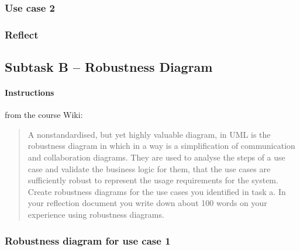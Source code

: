 



\subsubsection{Use case 2}\label{task-1a-usecase2}
%



\subsubsection{Reflect}\label{task-1a-reflect}
%



\subsection{Subtask B -- Robustness Diagram}\label{task-1b}
\paragraph{Instructions}\label{task-1b-instructions}
from the course Wiki\cite{1dv600:lab2:instructions}:

\begin{quote}
  A non­standardised, but yet highly valuable diagram, in UML is the robustness
  diagram in which in a way is a simplification of communication and
  collaboration diagrams. They are used to analyse the steps of a use case and
  validate the business logic for them, that the use cases are sufficiently
  robust to represent the usage requirements for the system.  Create robustness
  diagrams for the use cases you identified in task a. In your reflection
  document you write down about 100 words on your experience using robustness
  diagrams.
\end{quote}


\subsubsection{Robustness diagram for use case 1}\label{task-1b-robust1}
%


